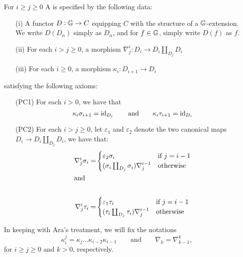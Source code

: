 \begin{defn}
For \(i\geq j\geq 0\)
A  is specified by the following data:
\begin{enumerate}
\item [(i)] A functor \(D:\mathbb{G} \to C\) equipping \(C\) with the structure of a \(\mathbb{G}\)-extension.  We write \(D(D_n)\) simply as \(D_n\), and for \(f\in \mathbb{G}\), simply write \(D(f)\) as \(f\).  
\item [(ii)] For each \(i>j\geq 0\), a morphism \(\nabla^i_j:D_i \to D_i \coprod_{D_j} D_i\)
\item [(iii)] For each \(i\geq 0\), a morphism \(\kappa_i:D_{i+1}\to D_i\)
\end{enumerate}
satisfying the following axioms:
\begin{enumerate}
\item [(PC1)] For each \(i> 0\), we have that \[\kappa_i \sigma_{i+1}=\operatorname{id}_{D_i} \qquad \text{and} \qquad   \kappa_i \tau_{i+1}=\operatorname{id}_{D_i}\]
\item [(PC2)] For each \(i>j\geq 0\), let \(\varepsilon_1\) and \(\varepsilon_2\) denote the two canonical maps \(D_i\to D_i\coprod_{D_j} D_i\), we have that: 
\begin{align*}
\nabla^i_j \sigma_i = &\begin{cases}\varepsilon_2\sigma_i & \text{if \(j=i-1\)}\\ (\sigma_i\coprod_{D_j} \sigma_i)\nabla^{i-1}_j &\text{otherwise}\end{cases}\\
\intertext{and}\\
\nabla^i_j \tau_i = &\begin{cases}\varepsilon_1\tau_i & \text{if \(j=i-1\)}\\ (\tau_i\coprod_{D_j} \tau_i)\nabla^{i-1}_j & \text{otherwise}\end{cases}
\end{align*}
\end{enumerate}

\end{defn}

In keeping with Ara's treatment, we will fix the notations \[\kappa^j_i=\kappa_j\hdots\kappa_{i-2}\kappa_{i-1}\qquad\text{and}\qquad \nabla_k=\nabla^k_{k-1},\]
for \(i\geq j\geq 0\) and \(k>0\), respectively.  

